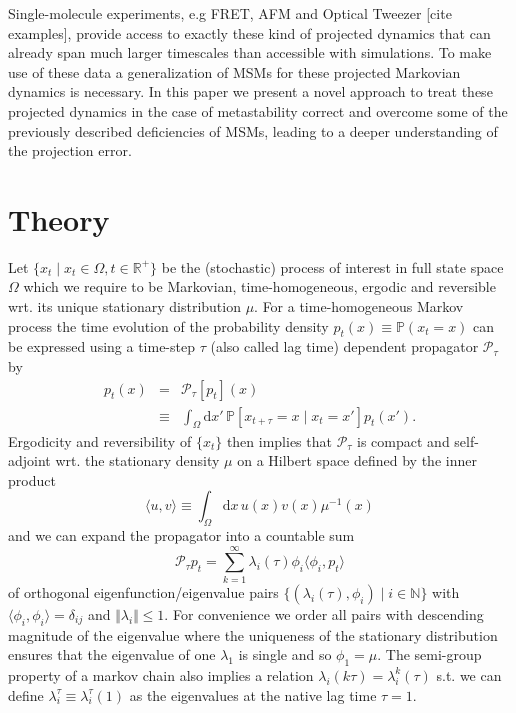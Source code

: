 \documentclass[aps,pre,twocolumn,nofootinbib,superscriptaddress,linenumbers]{revtex4-1}
\begin{document}
Single-molecule experiments, e.g FRET, AFM and Optical Tweezer {[}cite
examples{]}, provide access to exactly these kind of projected dynamics
that can already span much larger timescales than accessible with
simulations. To make use of these data a generalization of MSMs for
these projected Markovian dynamics is necessary. In this paper we
present a novel approach to treat these projected dynamics in the
case of metastability correct and overcome some of the previously
described deficiencies of MSMs, leading to a deeper understanding
of the projection error.


\section{Theory}
\label{section:theory}

Let $\{x_{t}\mid x_{t}\in\Omega,t\in\mathbb{R}^{+}\}$ be the (stochastic)
process of interest in full state space $\Omega$ which we require
to be Markovian, time-homogeneous, ergodic and reversible wrt. its
unique stationary distribution $\mu$. For a time-homogeneous Markov
process the time evolution of the probability density $p_{t}(x)\equiv\mathbb{P}(x_{t}=x)$
can be expressed using a time-step $\tau$ (also called lag time)
dependent propagator $\mathcal{P}_{\tau}$ by \cite{Schutte:1999ju,Schutte:2003ty}
\begin{eqnarray*}
p_{t}(x) & = & \mathcal{P}_{\tau}\left[p_{t}\right](x)\\
 & \equiv & \int_{\Omega}\text{d}x'\,\mathbb{P}\left[x_{t+\tau}=x\mid x_{t}=x'\right]p_{t}(x').
\end{eqnarray*}
Ergodicity and reversibility of $\{x_{t}\}$ then implies that $\mathcal{P}_{\tau}$
is compact and self-adjoint wrt. the stationary density $\mu$ on
a Hilbert space defined by the inner product
\[
\langle u,v\rangle\equiv\int_{\Omega}\text{d}x\, u(x)v(x)\mu^{-1}(x)
\]
and we can expand the propagator into a countable sum 
\[
\mathcal{P}_{\tau}p_{t}=\sum_{k=1}^{\infty}\lambda_{i}(\tau)\phi_{i}\langle\phi_{i},p_{t}\rangle
\]
of orthogonal eigenfunction/eigenvalue pairs $\{(\lambda_{i}(\tau),\phi_{i})\mid i\in\mathbb{N}\}$
with $\langle\phi_{i},\phi_{i}\rangle=\delta_{ij}$ and $\Vert\lambda_{i}\Vert\leq1$.
For convenience we order all pairs with descending magnitude of the
eigenvalue where the uniqueness of the stationary distribution ensures
that the eigenvalue of one $\lambda_{1}$ is single and so $\phi_{1}=\mu$.
The semi-group property of a markov chain also implies a relation
$\lambda_{i}(k\tau)=\lambda_{i}^{k}(\tau)$ s.t. we can define $\lambda_{i}^{\tau}\equiv\lambda_{i}^{\tau}(1)$
as the eigenvalues at the native lag time $\tau=1$. 
\end{document}
